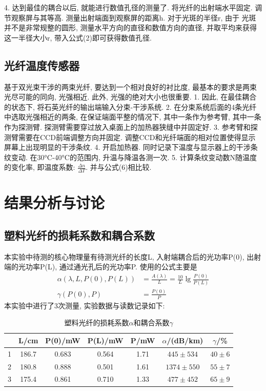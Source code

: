 \documentclass[12pt,a4paper]{article}
\begin{document}
4. 达到最佳的耦合以后, 就能进行数值孔径的测量了. 将光纤的出射端水平固定. 调节观察屏与其等高. 测量出射端面到观察屏的距离h. 对于光斑的半径r, 由于
光斑并不是非常规整的圆形, 测量水平方向的直径和数值方向的直径, 并取平均来获得这一半径大小r, 带入公式(2)即可获得数值孔径. 

\subsection{光纤温度传感器}
基于双光束干涉的两束光纤, 要达到一个相对良好的衬比度, 最基本的要求是两束光尽可能的同向, 光强相近. 此外, 光强的绝对大小也很重要. 
1. 因此, 在最佳耦合的状态下, 将石英光纤的输出端输入分束-干涉系统. 
2. 在分束系统后面的4条光纤中选取光强相近的两条, 在保证端面平整的情况下, 其中一条作为参考臂, 其中一条作为探测臂. 探测臂需要穿过放入桌面上的加热器狭缝中并固定好. 
3. 参考臂和探测臂需要在CCD前端调整方向并固定. 调整CCD和光纤端面的相对位置使得显示屏幕上出现明显的干涉条纹. 
4. 开启加热器. 同时记录下温度与显示器上的干涉条纹变动. 在30°C-40°C的范围内, 升温与降温各测一次. 
5. 计算条纹变动数N随温度的变化率, 即温度系数: $\frac{\Delta n}{\Delta T}$. 并与公式(6)相比较.

\section{结果分析与讨论}
\subsection{塑料光纤的损耗系数和耦合系数}
本实验中待测的核心物理量有待测光纤的长度L, 入射端耦合后的光功率P(0), 出射端的光功率P(L), 通过通光孔后的光功率P.
使用的公式主要是
\begin{equation}
    \begin{aligned}
    \alpha(\lambda,L,P(0),P(L))&=\frac{A(\lambda)}{L}=\frac{10}{L}\lg{\frac{P(0)}{P(L)}}
    \\
    \gamma(P(0),P)&=\frac{P(0)}{P}
    \end{aligned}
\end{equation}
本实验中进行了3次测量, 实验数据与读数记录如下: 
\begin{table}[H]
    \centering
    \begin{tabular}{|c|c|c|c|c|c|c|} 
    \hline
      & L/cm  & P(0)/mW & P(L)/mW & P/mW & $\alpha$/(dB/km) & $\gamma$/\%  \\ 
    \hline
    1 & 186.7 & 0.683   & 0.564   & 1.71 & $445 \pm 534$                    & $40\pm 6  $                 \\ 
    \hline
    2 & 180.8 & 0.888   & 0.501   & 1.61 & $1374 \pm 550$                   & $55\pm 7 $                   \\ 
    \hline
    3 & 175.4 & 0.861   & 0.710    & 1.33 & $477 \pm 452 $                   & $65 \pm 9 $                  \\
    \hline
    \end{tabular}
    \caption{塑料光纤的损耗系数$\alpha$和耦合系数$\gamma$}
\end{table}
\end{document}
